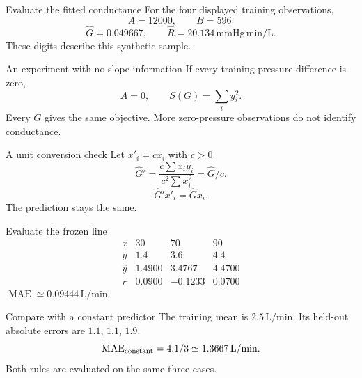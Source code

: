 \documentclass[aspectratio=169,11pt]{beamer}
\newcommand{\notestarget}{notes.pdf}\newcommand{\noteslabel}{Notes}
\begin{document}
\renewcommand{\notestarget}{notes.pdf\#note-least-squares-without-differentiation}
\begin{frame}[t,fragile,label=slide-evaluate-the-fitted-conductance]{Evaluate the fitted conductance}
For the four displayed training observations,
\[A=12000,\qquad B=596.\]
\pause{}
\[\widehat G=0.049667,\qquad\widehat R=20.134\,\mathrm{mmHg\,min/L}.\]
These digits describe this synthetic sample.
\end{frame}
\renewcommand{\notestarget}{notes.pdf\#note-least-squares-without-differentiation}
\begin{frame}[t,fragile,label=slide-an-experiment-with-no-slope-information]{An experiment with no slope information}
If every training pressure difference is zero,
\[A=0,\qquad S(G)=\sum_i y_i^2.\]
\pause{}
Every $G$ gives the same objective.
More zero-pressure observations do not identify conductance.
\end{frame}
\renewcommand{\notestarget}{notes.pdf\#note-least-squares-without-differentiation}
\begin{frame}[t,fragile,label=slide-a-unit-conversion-check]{A unit conversion check}
Let $x'_i=cx_i$ with $c>0$.
\[\widehat G'=\frac{c\sum x_iy_i}{c^2\sum x_i^2}=\widehat G/c.\]
\pause{}
\[\widehat G'x'_i=\widehat Gx_i.\]
The prediction stays the same.
\end{frame}
\renewcommand{\notestarget}{notes.pdf\#note-a-frozen-rule-on-new-observations}
\begin{frame}[t,fragile,label=slide-evaluate-the-frozen-line]{Evaluate the frozen line}
\[
\begin{array}{c|rrr}
x&30&70&90\\\hline
y&1.4&3.6&4.4\\
\widehat y&1.4900&3.4767&4.4700\\
r&0.0900&-0.1233&0.0700
\end{array}
\]
\pause{}
$\operatorname{MAE}\simeq0.09444\,\mathrm{L/min}$.
\end{frame}
\renewcommand{\notestarget}{notes.pdf\#note-a-frozen-rule-on-new-observations}
\begin{frame}[t,fragile,label=slide-compare-with-a-constant-predictor]{Compare with a constant predictor}
The training mean is $2.5\,\mathrm{L/min}$.
\pause{}
Its held-out absolute errors are $1.1$, $1.1$, $1.9$.
\[\operatorname{MAE}_{\rm constant}=4.1/3\simeq1.3667\,\mathrm{L/min}.\]
Both rules are evaluated on the same three cases.
\end{frame}
\renewcommand{\notestarget}{notes.pdf\#note-training-coordinates-and-class-centers}
\end{document}
